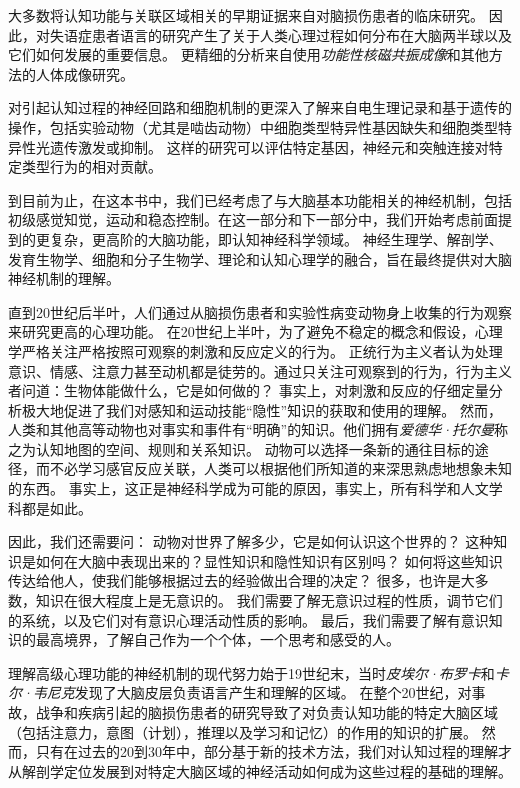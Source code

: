 大多数将认知功能与关联区域相关的早期证据来自对脑损伤患者的临床研究。
因此，对失语症患者语言的研究产生了关于人类心理过程如何分布在大脑两半球以及它们如何发展的重要信息。
更精细的分析来自使用\textit{功能性核磁共振成像}和其他方法的人体成像研究。


对引起认知过程的神经回路和细胞机制的更深入了解来自电生理记录和基于遗传的操作，包括实验动物（尤其是啮齿动物）中细胞类型特异性基因缺失和细胞类型特异性光遗传激发或抑制。
这样的研究可以评估特定基因，神经元和突触连接对特定类型行为的相对贡献。


到目前为止，在这本书中，我们已经考虑了与大脑基本功能相关的神经机制，包括初级感觉知觉，运动和稳态控制。在这一部分和下一部分中，我们开始考虑前面提到的更复杂，更高阶的大脑功能，即认知神经科学领域。
神经生理学、解剖学、发育生物学、细胞和分子生物学、理论和认知心理学的融合，旨在最终提供对大脑神经机制的理解。


直到20世纪后半叶，人们通过从脑损伤患者和实验性病变动物身上收集的行为观察来研究更高的心理功能。
在20世纪上半叶，为了避免不稳定的概念和假设，心理学严格关注严格按照可观察的刺激和反应定义的行为。
正统行为主义者认为处理意识、情感、注意力甚至动机都是徒劳的。通过只关注可观察到的行为，行为主义者问道：生物体能做什么，它是如何做的？
事实上，对刺激和反应的仔细定量分析极大地促进了我们对感知和运动技能“隐性”知识的获取和使用的理解。
然而，人类和其他高等动物也对事实和事件有“明确”的知识。他们拥有\textit{爱德华·托尔曼}称之为认知地图的空间、规则和关系知识。
动物可以选择一条新的通往目标的途径，而不必学习感官反应关联，人类可以根据他们所知道的来深思熟虑地想象未知的东西。
事实上，这正是神经科学成为可能的原因，事实上，所有科学和人文学科都是如此。


因此，我们还需要问：
动物对世界了解多少，它是如何认识这个世界的？
这种知识是如何在大脑中表现出来的？显性知识和隐性知识有区别吗？
如何将这些知识传达给他人，使我们能够根据过去的经验做出合理的决定？
很多，也许是大多数，知识在很大程度上是无意识的。
我们需要了解无意识过程的性质，调节它们的系统，以及它们对有意识心理活动性质的影响。
最后，我们需要了解有意识知识的最高境界，了解自己作为一个个体，一个思考和感受的人。


理解高级心理功能的神经机制的现代努力始于19世纪末，当时\textit{皮埃尔·布罗卡}和\textit{卡尔·韦尼克}发现了大脑皮层负责语言产生和理解的区域。
在整个20世纪，对事故，战争和疾病引起的脑损伤患者的研究导致了对负责认知功能的特定大脑区域（包括注意力，意图（计划），推理以及学习和记忆）的作用的知识的扩展。
然而，只有在过去的20到30年中，部分基于新的技术方法，我们对认知过程的理解才从解剖学定位发展到对特定大脑区域的神经活动如何成为这些过程的基础的理解。


